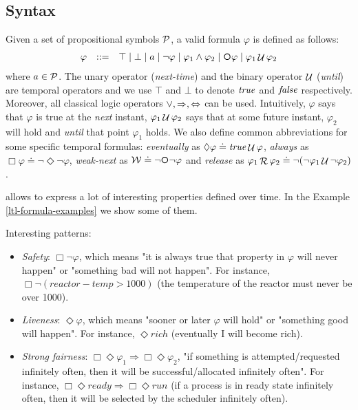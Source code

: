\subsection{Syntax}
Given a set of propositional symbols $\P$, a valid \LTL formula $\varphi$ is defined as follows:
\[\begin{array}{rcl}
\varphi &::=& \top \mid \bot \mid a \mid \lnot \varphi \mid \varphi_1\land \varphi_2 \mid \Next\varphi \mid \varphi_1 \lUntil \varphi_2
\end{array}
\]
where $a\in \P$. The unary operator \Next  (\emph{next-time}) and the binary operator $\lUntil$  (\emph{until}) are temporal operators and we use $\top$ and $\bot$ to denote $\true$ and $\false$ respectively. Moreover, all classical logic operators $\lOR, \Rightarrow, \Leftrightarrow$ can be used. 
Intuitively, \Next $\varphi$ says that $\varphi$ is true at the \textit{next} instant, $\varphi_1 \lUntil \varphi_2$ says that at some future instant, $\varphi_2$ will hold and \textit{until} that point $\varphi_1$ holds. We also define common abbreviations for some specific temporal formulas: \emph{eventually} as $\Diamond \varphi \doteq \true \lUntil \varphi$, \emph{always} as $\Box \varphi \doteq \lnot \Diamond \lnot \varphi$, \emph{weak-next} as $\W \doteq \lnot \Next \lnot \varphi$ and \emph{release} as $\varphi_1 \Release \varphi_2 \doteq \lnot (\lnot \varphi_1 \lUntil \lnot \varphi_2)$. 

\LTL allows to express a lot of interesting properties defined over time. In the Example \ref{ltl-formula-examples} we show some of them.
\begin{example}\label{ltl-formula-examples}
Interesting \LTL patterns:
\begin{itemize}
	\item \emph{Safety}: $\Box \lnot \varphi$, which means "it is always true that property in $\varphi$ will never happen" or "something bad will not happen". For instance, $\Box \lnot (reactor-temp > 1000)$ (the temperature of the reactor must never be over 1000).
	\item \emph{Liveness}: $\Diamond \varphi$, which means "sooner or later $\varphi$ will hold" or "something good will happen". For instance, $\Diamond rich$ (eventually I will become rich).
	\item \emph{Strong fairness}: $\Box \Diamond \varphi_1 \Rightarrow \Box \Diamond \varphi_2$, "if something is attempted/requested infinitely often, then it will be successful/allocated infinitely often". For instance, $\Box \Diamond ready \Rightarrow \Box \Diamond run$ (if a process is in ready state infinitely often, then it will be selected by the scheduler infinitely often).
\end{itemize}
\end{example}
